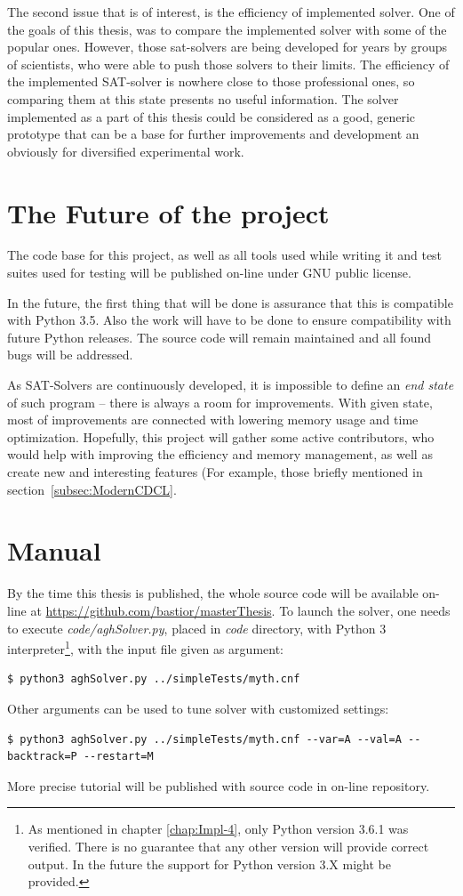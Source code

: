 \documentclass[12pt,english,pdflatex]{aghdpl}
\begin{document}
The second issue that is of interest, is the efficiency of implemented solver. One of the goals of this thesis, was to compare the implemented solver with some of the popular ones. However, those sat-solvers are being developed for years by groups of scientists, who were able to push those solvers to their limits. The efficiency of the implemented SAT-solver is nowhere close to those professional ones, so comparing them at this state presents no useful information. The solver implemented as a part of this thesis could be considered as a good, generic prototype that can be a base for further improvements and development an obviously for diversified experimental work.

\section{The Future of the project}
The code base for this project, as well as all tools used while writing it and test suites used for testing will be published on-line under GNU public license.

In the future, the first thing that will be done is assurance that this is compatible with Python 3.5. Also the work will have to be done to ensure compatibility with future Python releases. The source code will remain maintained and all found bugs will be addressed.

As SAT-Solvers are continuously developed, it is impossible to define an \textit{end state} of such program -- there is always a room for improvements. With given state, most of improvements are connected with lowering memory usage and time optimization. Hopefully, this project will gather some active contributors, who would help with improving the efficiency and memory management, as well as create new and interesting features (For example, those briefly mentioned in section~\ref{subsec:ModernCDCL}.

\section{Manual}
By the time this thesis is published, the whole source code will be available on-line at \url{https://github.com/bastior/masterThesis}. To launch the solver, one needs to execute \textit{code/aghSolver.py}, placed in \textit{code} directory, with Python 3 interpreter\footnote{As mentioned in chapter \ref{chap:Impl-4}, only Python version 3.6.1 was verified. There is no guarantee that any other version will provide correct output. In the future the support for Python version 3.X might be provided.}, with the input file given as argument:
\begin{lstlisting}
$ python3 aghSolver.py ../simpleTests/myth.cnf
\end{lstlisting}
Other arguments can be used to tune solver with customized settings:
\begin{lstlisting}
$ python3 aghSolver.py ../simpleTests/myth.cnf --var=A --val=A --backtrack=P --restart=M
\end{lstlisting}
More precise tutorial will be published with source code in on-line repository.
 
\end{document}
